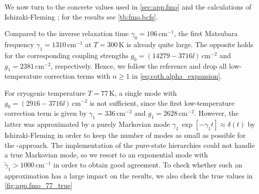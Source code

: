 We now turn to the concrete values used in \autoref{sec:app.fmo} and the calculations of Ishizaki-Fleming \cite{IsFl09_fmo}; for the results see \autoref{tb:fmo.bcfs}.

Compared to the inverse relaxation time $\gamma_0 = 106\,\mathrm{cm^{-1}}$, the first Matsubara frequency $\gamma_1 = 1310\,\mathrm{cm^{-1}}$ at $T = 300\,\mathrm{K}$ is already quite large.
The opposite holds for the corresponding coupling strengths $g_0 = (14279 - 3716\ii)\,\mathrm{cm^{-2}}$ and $g_1 = 2381\,\mathrm{cm^{-2}}$, respectively.
Hence, we follow the reference and drop all low-temperature correction terms with $n \ge 1$ in \autoref{eq:coth.alpha_expansion}.

For cryogenic temperature $T = 77\,\mathrm{K}$, a single mode with $g_0 = (2916 - 3716\ii)\,\mathrm{cm^{-2}}$ is not sufficient, since the first low-temperature correction term is given by $\gamma_1 = 336\,\mathrm{cm^{-2}}$ and $g_1 = 2628\,\mathrm{cm^{-2}}$.
However, the latter was approximated by a purely Markovian mode $\gamma_1\,\exp[-\gamma_1 t] \approx \delta(t)$ by Ishizaki-Fleming in order to keep the number of modes as small as possible for the \HEOM-approach.
The implementation of the pure-state hierarchies could not handle a true Markovian mode, so we resort to an exponential mode with $\tilde\gamma_1 > 1000\,\mathrm{cm^{-1}}$ in order to obtain good agreement.
To check whether such an approximation has a large impact on the results, we also check the true values in \autoref{fig:app.fmo_77_true}

